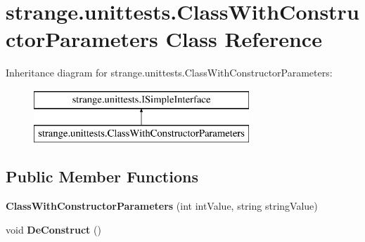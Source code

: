 \hypertarget{classstrange_1_1unittests_1_1_class_with_constructor_parameters}{\section{strange.\-unittests.\-Class\-With\-Constructor\-Parameters Class Reference}
\label{classstrange_1_1unittests_1_1_class_with_constructor_parameters}
}
Inheritance diagram for strange.\-unittests.\-Class\-With\-Constructor\-Parameters\-:\begin{figure}[H]
\begin{center}
\leavevmode
\includegraphics[height=2.000000cm]{classstrange_1_1unittests_1_1_class_with_constructor_parameters}
\end{center}
\end{figure}
\subsection*{Public Member Functions}
\begin{DoxyCompactItemize}
\item 
\hypertarget{classstrange_1_1unittests_1_1_class_with_constructor_parameters_a99d93edae8f4f8b8e30a2d7adb7fac50}{{\bfseries Class\-With\-Constructor\-Parameters} (int int\-Value, string string\-Value)}\label{classstrange_1_1unittests_1_1_class_with_constructor_parameters_a99d93edae8f4f8b8e30a2d7adb7fac50}

\item 
\hypertarget{classstrange_1_1unittests_1_1_class_with_constructor_parameters_af30566ee96ed6c4f76ffc984d045cd2a}{void {\bfseries De\-Construct} ()}\label{classstrange_1_1unittests_1_1_class_with_constructor_parameters_af30566ee96ed6c4f76ffc984d045cd2a}

\end{DoxyCompactItemize}
